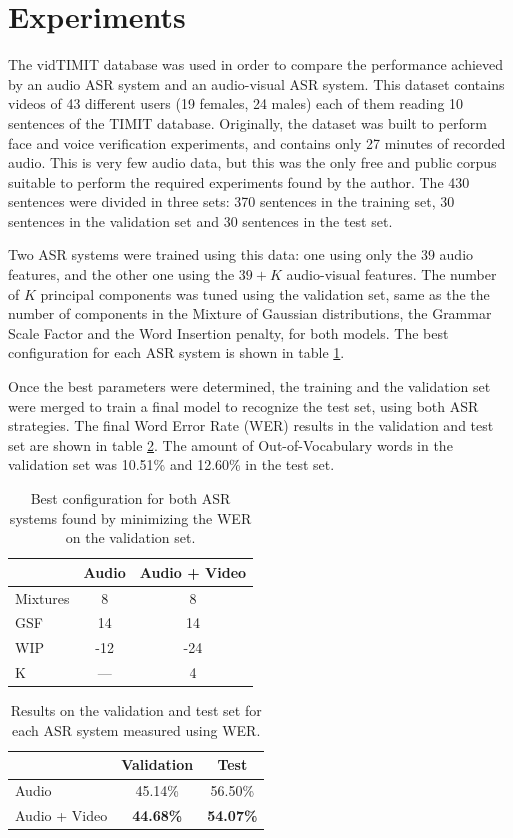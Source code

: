 \documentclass[12pt,a4paper]{article}
\begin{document}
\section{Experiments}
The vidTIMIT database\cite{sanderson2008biometric} was used in order to compare the performance achieved by an audio ASR system and an audio-visual ASR system. This dataset contains videos of 43 different users (19 females, 24 males) each of them reading 10 sentences of the TIMIT database. Originally, the dataset was built to perform face and voice verification experiments, and contains only 27 minutes of recorded audio. This is very few audio data, but this was the only free and public corpus suitable to perform the required experiments found by the author. The 430 sentences were divided in three sets: 370 sentences in the training set, 30 sentences in the validation set and 30 sentences in the test set.

Two ASR systems were trained using this data: one using only the 39 audio features, and the other one using the $39+K$ audio-visual features. The number of $K$ principal components was tuned using the validation set, same as the the number of components in the Mixture of Gaussian distributions, the Grammar Scale Factor and the Word Insertion penalty, for both models. The best configuration for each ASR system is shown in table \ref{tab:best_config}.

Once the best parameters were determined, the training and the validation set were merged to train a final model to recognize the test set, using both ASR strategies. The final Word Error Rate (WER) results in the validation and test set are shown in table \ref{tab:results}. The amount of Out-of-Vocabulary words in the validation set was 10.51\% and 12.60\% in the test set.

\begin{table}
\centering
\begin{tabular}{|l|c|c|}
\hline
 & Audio & Audio + Video \\
 \hline
 Mixtures & 8 & 8 \\
 GSF & 14 & 14 \\
 WIP & -12 & -24 \\
 K & --- & 4 \\
\hline
\end{tabular}
\caption{Best configuration for both ASR systems found by minimizing the WER on the validation set.}
\label{tab:best_config}
\end{table}

\begin{table}
\centering
\begin{tabular}{|l|c|c|}
\hline
& Validation & Test \\
\hline
Audio & 45.14\% & 56.50\%\\
Audio + Video & \textbf{44.68\%} & \textbf{54.07\%}\\
\hline
\end{tabular}
\caption{Results on the validation and test set for each ASR system measured using WER.}
\label{tab:results}
\end{table}
\end{document}
